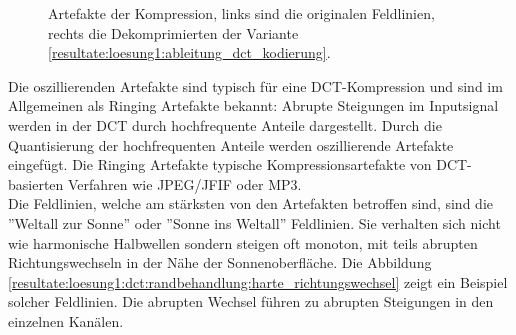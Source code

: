 \begin{figure}[!htbp]
	\center
	\caption{Artefakte der Kompression, links sind die originalen Feldlinien, rechts die Dekomprimierten der Variante \ref{resultate:loesung1:ableitung_dct_kodierung}.}
	\label{resultate:loesung1:dct:randbehandlung:jvhartefakte_loesung6}
\end{figure}
Die oszillierenden Artefakte sind typisch für eine DCT-Kompression und sind im Allgemeinen als Ringing Artefakte \cite{wiki:ringing:artefacts} bekannt: Abrupte Steigungen im Inputsignal werden in der DCT durch hochfrequente Anteile dargestellt. Durch die Quantisierung der hochfrequenten Anteile werden oszillierende Artefakte eingefügt. Die Ringing Artefakte typische Kompressionsartefakte von DCT-basierten Verfahren wie JPEG/JFIF oder MP3.\\
Die Feldlinien, welche am stärksten von den Artefakten betroffen sind, sind die ''Weltall zur Sonne'' oder ''Sonne ins Weltall'' Feldlinien. Sie verhalten sich nicht wie harmonische Halbwellen sondern steigen oft monoton, mit teils abrupten Richtungswechseln in der Nähe der Sonnenoberfläche. Die Abbildung \ref{resultate:loesung1:dct:randbehandlung:harte_richtungswechsel} zeigt ein Beispiel solcher Feldlinien. Die abrupten Wechsel führen zu abrupten Steigungen in den einzelnen Kanälen.
